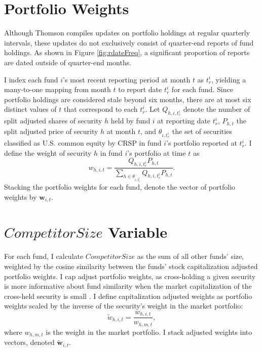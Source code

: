 \documentclass[]{book}
\theoremstyle{definition}
\theoremstyle{definition}
\theoremstyle{definition}
\theoremstyle{remark}
\begin{document}
\hypertarget{sec:portfolioWeights}{%
\section{Portfolio Weights}\label{sec:portfolioWeights}}

Although Thomson compiles updates on portfolio holdings at regular
quarterly intervals, these updates do not exclusively consist of
quarter-end reports of fund holdings. As shown in Figure
\ref{fig:rdateFreq}, a significant proportion of reports are dated
outside of quarter-end months.

I index each fund \(i\)'s most recent reporting period at month \(t\) as
\(t^i_r\), yielding a many-to-one mapping from month \(t\) to report
date \(t^i_r\) for each fund. Since portfolio holdings are considered
stale beyond six months, there are at most six distinct values of \(t\)
that correspond to each \(t^i_r\). Let \(Q_{h,i,t^i_r}\) denote the
number of split adjusted shares of security \(h\) held by fund \(i\) at
reporting date \(t^i_r\), \(P_{h,t}\) the split adjusted price of
security \(h\) at month \(t\), and \(\theta_{i,t^i_r}\) the set of
securities classified as U.S. common equity by CRSP in fund \(i\)'s
portfolio reported at \(t^i_r\). I define the weight of security \(h\)
in fund \(i\)'s portfolio at time \(t\) as \begin{equation}
w_{h,i,t} = \frac{Q_{h,i,t^i_r} P_{h,t} }{\sum_{h\in\theta_{i,t^i_r}} Q_{h,i,t^i_r} P_{h,t} }.
\end{equation} Stacking the portfolio weights for each fund, denote the
vector of portfolio weights by \(\mathbf{w}_{i,t}\).

\hypertarget{sec:CompetitorSize}{%
\section{\texorpdfstring{\(CompetitorSize\)
Variable}{CompetitorSize Variable}}\label{sec:CompetitorSize}}

For each fund, I calculate \(CompetitorSize\) as the sum of all other
funds' size, weighted by the cosine similarity between the funds' stock
capitalization adjusted portfolio weights. I cap adjust portfolio
weights, as cross-holding a given security is more informative about
fund similarity when the market capitalization of the cross-held
security is small \citep{ccp05}. I define capitalization adjusted
weights as portfolio weights scaled by the inverse of the security's
weight in the market portfolio: \begin{equation}
\tilde{w}_{h,i,t} = \frac{w_{h,i,t}}{w_{h,m,t}},
\end{equation} where \(w_{h,m,t}\) is the weight in the market
portfolio. I stack adjusted weights into vectors, denoted
\(\mathbf{\tilde{w}}_{i,t}\).
\end{document}

